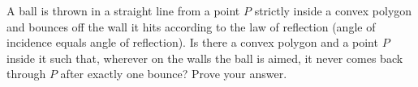 A ball is thrown in a straight line from a point $P$ strictly inside a convex polygon and bounces off the wall it hits according to the law of reflection (angle of incidence equals angle of reflection). Is there a convex polygon and a point $P$ inside it such that, wherever on the walls the ball is aimed, it never comes back through $P$ after exactly one bounce? Prove your answer.
